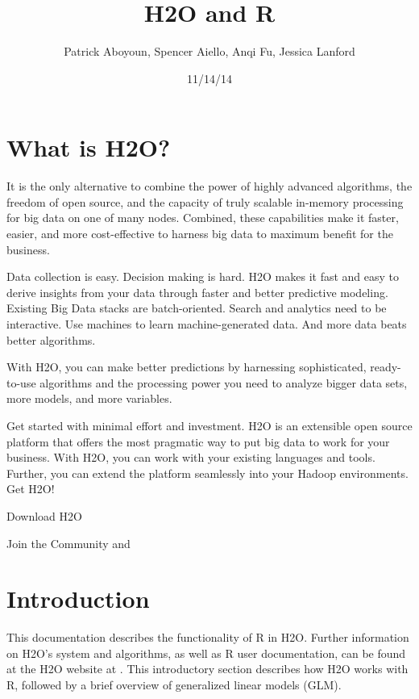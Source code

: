 \documentclass[11pt]{article}
\begin{document}
\title{H2O and R}
\author{Patrick Aboyoun, Spencer Aiello, Anqi Fu, Jessica Lanford}
\date{11/14/14}
\maketitle



\section{What is H2O?}

It is the only alternative to combine the power of highly advanced algorithms, the freedom of open source, and the capacity of truly scalable in-memory processing for big data on one of many nodes. Combined, these capabilities make it faster, easier, and more cost-effective to harness big data to maximum benefit for the business. 

Data collection is easy. Decision making is hard. H2O makes it fast and easy to derive insights from your data through faster and better predictive modeling. Existing Big Data stacks are batch-oriented. Search and analytics need to be interactive. Use machines to learn machine-generated data. And more data beats better algorithms. 

With H2O, you can make better predictions by harnessing sophisticated, ready-to-use algorithms and the processing power you need to analyze bigger data sets, more models, and more variables. 

Get started with minimal effort and investment. H2O is an extensible open source platform that offers the most pragmatic way to put big data to work for your business. With H2O, you can work with your existing languages and tools. Further, you can extend the platform seamlessly into your Hadoop environments. Get H2O!

Download H2O

Join the Community
 and 

\section{Introduction}

This documentation describes the functionality of R in H2O. Further information on H2O's system and algorithms, as well as R user documentation, can be found at the H2O website at . This introductory section describes how H2O works with R, followed by a brief overview of generalized linear models (GLM). 
\end{document}
